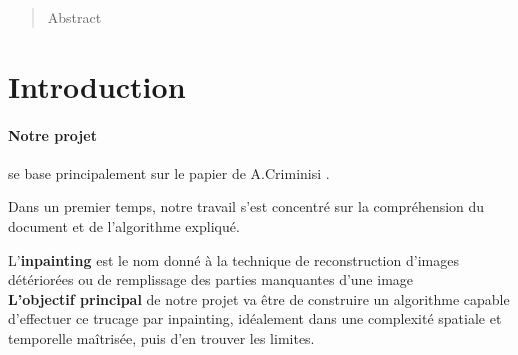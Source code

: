 \documentclass[12pt]{article}
\begin{document}

\newpage
\begin{abstract}
    Abstract
    
\end{abstract}

\tableofcontents
\setcounter{tocdepth}{2}



\newpage
\section*{Introduction}
\label{sec:intro}

\paragraph{Notre projet}

se base principalement sur le papier de A.Criminisi \cite{criminisi2004region}.

Dans un premier temps, notre travail s'est concentré sur la compréhension du document et de l'algorithme expliqué.

\vspace{7pt}

L'\textbf{inpainting} est le nom donné à la technique de reconstruction d'images détériorées ou de remplissage des parties manquantes d'une image\\[0.5cm]

\textbf{L'objectif principal} de notre projet va être de construire un algorithme capable d'effectuer ce trucage par inpainting, idéalement dans une complexité spatiale et temporelle maîtrisée, puis d'en trouver les limites.
\end{document}
